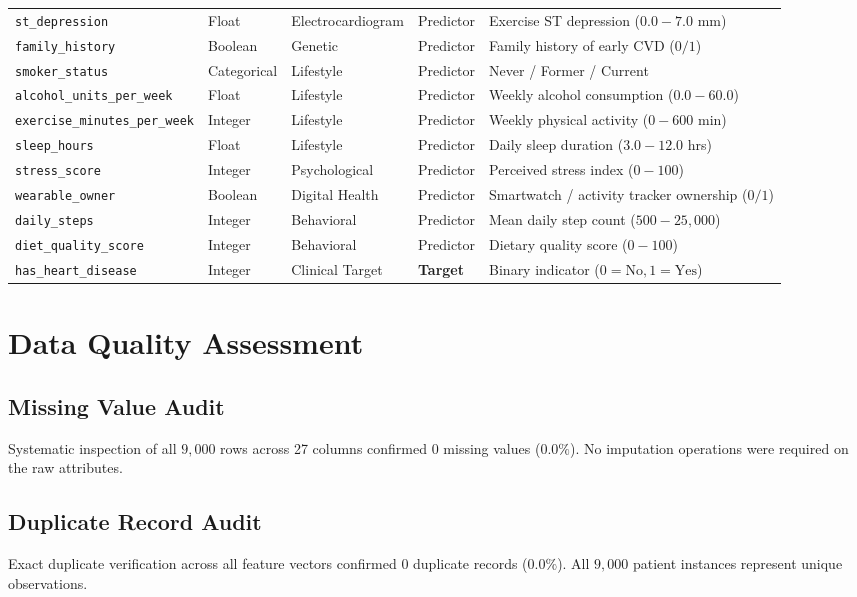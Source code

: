 \begin{table}[H]
\begin{tabular}{lllll}
\texttt{st\_depression} & Float & Electrocardiogram & Predictor & Exercise ST depression ($0.0 - 7.0$ mm) \\
\texttt{family\_history} & Boolean & Genetic & Predictor & Family history of early CVD ($0/1$) \\
\texttt{smoker\_status} & Categorical & Lifestyle & Predictor & Never / Former / Current \\
\texttt{alcohol\_units\_per\_week} & Float & Lifestyle & Predictor & Weekly alcohol consumption ($0.0 - 60.0$) \\
\texttt{exercise\_minutes\_per\_week} & Integer & Lifestyle & Predictor & Weekly physical activity ($0 - 600$ min) \\
\texttt{sleep\_hours} & Float & Lifestyle & Predictor & Daily sleep duration ($3.0 - 12.0$ hrs) \\
\texttt{stress\_score} & Integer & Psychological & Predictor & Perceived stress index ($0 - 100$) \\
\texttt{wearable\_owner} & Boolean & Digital Health & Predictor & Smartwatch / activity tracker ownership ($0/1$) \\
\texttt{daily\_steps} & Integer & Behavioral & Predictor & Mean daily step count ($500 - 25,000$) \\
\texttt{diet\_quality\_score} & Integer & Behavioral & Predictor & Dietary quality score ($0 - 100$) \\
\texttt{has\_heart\_disease} & Integer & Clinical Target & \textbf{Target} & Binary indicator ($0 = \text{No}, 1 = \text{Yes}$) \\
\bottomrule
\end{tabular}
\end{table}

\section{Data Quality Assessment}

\subsection{Missing Value Audit}
Systematic inspection of all $9,000$ rows across 27 columns confirmed $0$ missing values ($0.0\%$). No imputation operations were required on the raw attributes.

\subsection{Duplicate Record Audit}
Exact duplicate verification across all feature vectors confirmed $0$ duplicate records ($0.0\%$). All $9,000$ patient instances represent unique observations.

